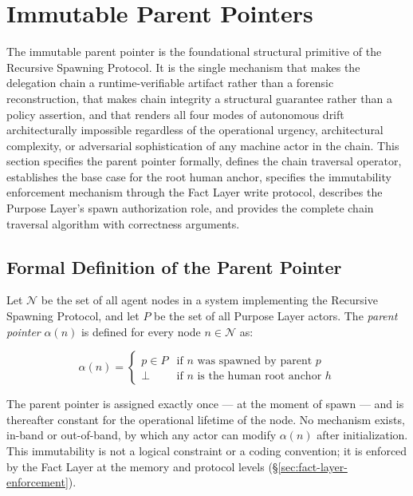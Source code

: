 \section{Immutable Parent Pointers}
\label{sec:immutable-parent-pointers}

The immutable parent pointer is the foundational structural primitive of the Recursive Spawning Protocol. It is the single mechanism that makes the delegation chain a runtime-verifiable artifact rather than a forensic reconstruction, that makes chain integrity a structural guarantee rather than a policy assertion, and that renders all four modes of autonomous drift architecturally impossible regardless of the operational urgency, architectural complexity, or adversarial sophistication of any machine actor in the chain. This section specifies the parent pointer formally, defines the chain traversal operator, establishes the base case for the root human anchor, specifies the immutability enforcement mechanism through the Fact Layer write protocol, describes the Purpose Layer's spawn authorization role, and provides the complete chain traversal algorithm with correctness arguments.

\subsection{Formal Definition of the Parent Pointer}
\label{sec:parent-pointer-formal}

Let $\mathcal{N}$ be the set of all agent nodes in a \bxthree{} system implementing the Recursive Spawning Protocol, and let $P$ be the set of all Purpose Layer actors. The \emph{parent pointer} $\alpha(n)$ is defined for every node $n \in \mathcal{N}$ as:

\begin{equation}
\alpha(n) =
\begin{cases}
p \in P & \text{if $n$ was spawned by parent $p$} \\
\bot     & \text{if $n$ is the human root anchor $h$}
\end{cases}
\tag{PP-1}
\end{equation}

The parent pointer is assigned exactly once — at the moment of spawn — and is thereafter constant for the operational lifetime of the node. No mechanism exists, in-band or out-of-band, by which any actor can modify $\alpha(n)$ after initialization. This immutability is not a logical constraint or a coding convention; it is enforced by the Fact Layer at the memory and protocol levels (\S\ref{sec:fact-layer-enforcement}).

